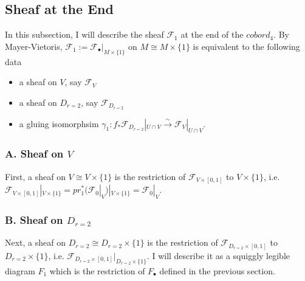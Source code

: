 \subsection*{Sheaf at the End}
In this subsection, I will describe the sheaf $\mathscr{F}_1$ at the end of the $cobord_4$. By Mayer-Vietoris, $\mathscr{F}_1:= \mathscr{F}_\bullet|_{M\times\{1\}}$ on $M \cong M\times\{1\}$ is equivalent to the following data
\begin{itemize}
\item a sheaf on $V$, say $\mathscr{F}_{V}$

\item a sheaf on $D_{r=2}$, say $\mathscr{F}_{D_{r=2}}$

\item a gluing isomorphsim $\gamma_1 : f_*\mathscr{F}_{D_{r=2}}|_{U\cap V} \xrightarrow{\sim} \mathscr{F}_{V}|_{U\cap V}$.
\end{itemize}

\subsubsection{A. Sheaf on $V$}
First, a sheaf on $V\cong V\times\{1\}$ is the restriction of $\mathscr{F}_{V\times [0,1]}$ to $V\times \{1\}$, i.e. $\mathscr{F}_{V\times [0,1]}|_{V\times \{1\}}= pr_1^*(\mathscr{F}_0|_V)|_{V\times \{1\}} = \mathscr{F}_0|_V$.
\subsubsection{B. Sheaf on $D_{r=2}$}
Next, a sheaf on $D_{r=2}\cong D_{r=2}\times \{1\}$ is the restriction of $\mathscr{F}_{D_{r=2}\times [0,1]}$ to $D_{r=2}\times \{1\}$, i.e. $\mathscr{F}_{D_{r=2}\times [0,1]} |_{D_{r=2}\times \{1\}}$. I will describe it as a squiggly legible diagram $F_1$ which is the restriction of $F_\bullet$ defined in the previous section.

